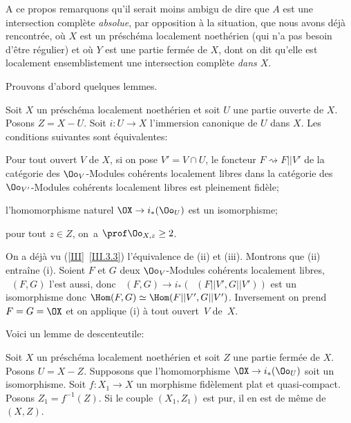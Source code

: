 A ce propos remarquons qu'il serait moins ambigu de dire que $A$ est une intersection compl\`ete \emph{absolue}, par opposition \`a la situation, que nous avons d\'ej\`a rencontr\'ee, o\`u $X$ est un pr\'esch\'ema localement noeth\'erien (qui n'a pas besoin d'\^etre r\'egulier) et o\`u $Y$ est une partie ferm\'ee de $X$, dont on dit qu'elle est \og localement ensemblistement une intersection compl\`ete \emph{dans $X$}\fg.

Prouvons d'abord quelques lemmes.

\begin{lemme} \label{X.3.5}
Soit $X$ un pr\'esch\'ema localement noeth\'erien et soit $U$ une partie ouverte de $X$. Posons $Z=X-U$. Soit $i\colon U\to X$ l'immersion canonique de $U$ dans $X$. Les conditions suivantes sont \'equivalentes:
\begin{enumeratei}
\item
Pour tout ouvert $V$ de $X$, si on pose $V'=V\cap U$, le foncteur $F\rightsquigarrow F|{|V'}$ de la cat\'egorie des $\Oo_V$-Modules coh\'erents localement libres dans la cat\'egorie des $\Oo_{{V'}}$-Modules coh\'erents localement libres est pleinement fid\`ele;

\item
l'homomorphisme naturel $\OX \to i_\ast(\Oo_{U})$ est un isomorphisme;

\item
pour tout $z\in Z$, on~a $\prof\Oo_{X, z}\geq 2$.
\end{enumeratei}
\end{lemme}

On a d\'ej\`a vu (\ref{III}~\ref{III.3.3}) l'\'equivalence de (ii) et (iii). Montrons que (ii) entra\^ine (i). Soient $F$ et $G$ deux $\Oo_V$-Modules coh\'erents localement libres, $\mathop{\underline{\mathrm{Hom}}}\nolimits(F, G)$ l'est aussi, donc $\mathop{\underline{\mathrm{Hom}}}\nolimits(F, G)\to i_\ast(\mathop{\underline{\mathrm{Hom}}}\nolimits(F|{|V'}, G|{|V'}))$ est un isomorphisme donc $\Hom(F, G)\simeq\Hom(F|{|V'}, G|{|V'})$. Inversement on prend $F=G=\OX$ et on applique (i) \`a tout ouvert~$V$ de~$X$.

Voici un \og lemme de descente\fg utile:

\begin{lemme} \label{X.3.6} Soit $X$ un pr\'esch\'ema localement noeth\'erien et soit $Z$ une partie ferm\'ee de $X$. Posons $U=X-Z$. Supposons que l'homomorphisme $\OX \to i_\ast(\Oo_U)$ soit un isomorphisme. Soit $f\colon X_1\to X$ un morphisme fid\`element plat et quasi-compact. Posons $Z_1=f^{-1}(Z)$. Si le couple $(X_1, Z_1)$ est pur, il en est de m\^eme de $(X, Z)$.
\end{lemme}

